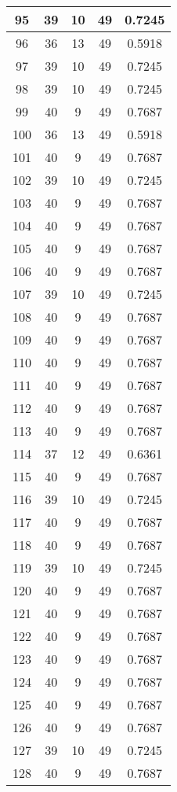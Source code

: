 \documentclass[letterpaper, 12pt]{article}
\begin{document}
\begin{longtable}{|c|c|c|c|c|}
95 & 39 & 10 & 49 & 0.7245 \\
\hline
96 & 36 & 13 & 49 & 0.5918 \\
\hline
97 & 39 & 10 & 49 & 0.7245 \\
\hline
98 & 39 & 10 & 49 & 0.7245 \\
\hline
99 & 40 & 9 & 49 & 0.7687 \\
\hline
100 & 36 & 13 & 49 & 0.5918 \\
\hline
101 & 40 & 9 & 49 & 0.7687 \\
\hline
102 & 39 & 10 & 49 & 0.7245 \\
\hline
103 & 40 & 9 & 49 & 0.7687 \\
\hline
104 & 40 & 9 & 49 & 0.7687 \\
\hline
105 & 40 & 9 & 49 & 0.7687 \\
\hline
106 & 40 & 9 & 49 & 0.7687 \\
\hline
107 & 39 & 10 & 49 & 0.7245 \\
\hline
108 & 40 & 9 & 49 & 0.7687 \\
\hline
109 & 40 & 9 & 49 & 0.7687 \\
\hline
110 & 40 & 9 & 49 & 0.7687 \\
\hline
111 & 40 & 9 & 49 & 0.7687 \\
\hline
112 & 40 & 9 & 49 & 0.7687 \\
\hline
113 & 40 & 9 & 49 & 0.7687 \\
\hline
114 & 37 & 12 & 49 & 0.6361 \\
\hline
115 & 40 & 9 & 49 & 0.7687 \\
\hline
116 & 39 & 10 & 49 & 0.7245 \\
\hline
117 & 40 & 9 & 49 & 0.7687 \\
\hline
118 & 40 & 9 & 49 & 0.7687 \\
\hline
119 & 39 & 10 & 49 & 0.7245 \\
\hline
120 & 40 & 9 & 49 & 0.7687 \\
\hline
121 & 40 & 9 & 49 & 0.7687 \\
\hline
122 & 40 & 9 & 49 & 0.7687 \\
\hline
123 & 40 & 9 & 49 & 0.7687 \\
\hline
124 & 40 & 9 & 49 & 0.7687 \\
\hline
125 & 40 & 9 & 49 & 0.7687 \\
\hline
126 & 40 & 9 & 49 & 0.7687 \\
\hline
127 & 39 & 10 & 49 & 0.7245 \\
\hline
128 & 40 & 9 & 49 & 0.7687 \\

\end{longtable}
\end{document}
